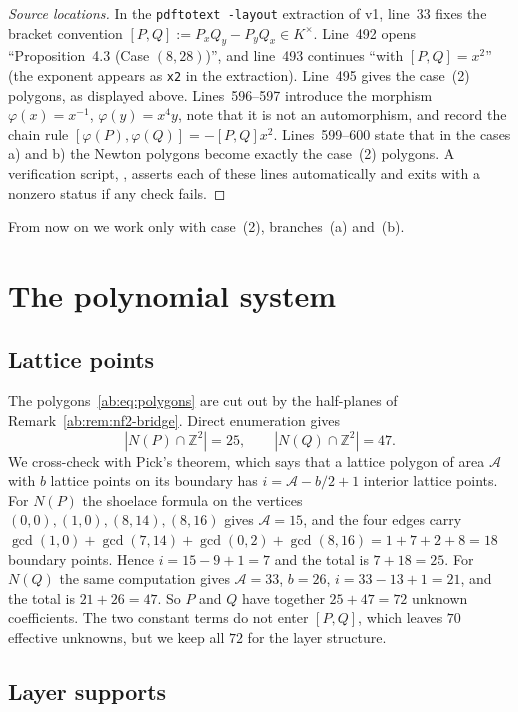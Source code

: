 \documentclass[a4paper,11pt]{article}
\newcommand{\filename}[1]{\texttt{\seqsplit{#1}}}
\theoremstyle{jsplain}
\theoremstyle{jsdef}
\theoremstyle{jsrem}
\begin{document}
\begin{proof}[Source locations]
In the \texttt{pdftotext -layout} extraction of v1, line~33 fixes the bracket convention $[P,Q]:=P_xQ_y-P_yQ_x\in K^\times$. Line~492 opens ``Proposition~4.3 (Case $(8,28)$)'', and line~493 continues ``with $[P,Q]=x^2$'' (the exponent appears as \texttt{x2} in the extraction). Line~495 gives the case~(2) polygons, as displayed above. Lines~596--597 introduce the morphism $\varphi(x)=x^{-1}$, $\varphi(y)=x^4y$, note that it is not an automorphism, and record the chain rule $[\varphi(P),\varphi(Q)]=-[P,Q]x^2$. Lines~599--600 state that in the cases a) and b) the Newton polygons become exactly the case~(2) polygons. A verification script, \filename{source\_gate\_verify.py}, asserts each of these lines automatically and exits with a nonzero status if any check fails.
\end{proof}

From now on we work only with case~(2), branches~(a) and~(b).

\section{The polynomial system}\label{ab:sec:system}

\subsection{Lattice points}

The polygons~\eqref{ab:eq:polygons} are cut out by the half-planes of Remark~\ref{ab:rem:nf2-bridge}. Direct enumeration gives
\begin{equation}
|N(P)\cap\mathbb{Z}^2|=25,\qquad |N(Q)\cap\mathbb{Z}^2|=47 .
\end{equation}
We cross-check with Pick's theorem, which says that a lattice polygon of area $\mathcal{A}$ with $b$ lattice points on its boundary has $i=\mathcal{A}-b/2+1$ interior lattice points. For $N(P)$ the shoelace formula on the vertices $(0,0),(1,0),(8,14),(8,16)$ gives $\mathcal{A}=15$, and the four edges carry $\gcd(1,0)+\gcd(7,14)+\gcd(0,2)+\gcd(8,16)=1+7+2+8=18$ boundary points. Hence $i=15-9+1=7$ and the total is $7+18=25$. For $N(Q)$ the same computation gives $\mathcal{A}=33$, $b=26$, $i=33-13+1=21$, and the total is $21+26=47$. So $P$ and $Q$ have together $25+47=72$ unknown coefficients. The two constant terms do not enter $[P,Q]$, which leaves $70$ effective unknowns, but we keep all $72$ for the layer structure.

\subsection{Layer supports}
\end{document}
